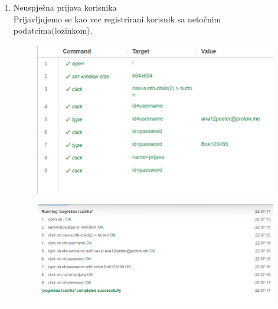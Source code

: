 \begin{enumerate}
    \item Neuspješna prijava korisnika\\
    Prijavljujemo se kao vec registrirani korisnik sa netočnim podatcima(lozinkom).
    \begin{figure}[H]
        \includegraphics[scale=0.30]{slike/deploy/fTest1a.png}
        \centering
        \label{fig:promjene2}
    \end{figure}
    \begin{figure}[H]
        \includegraphics[scale=0.30]{slike/deploy/fTest1b.png}
        \centering
        \label{fig:promjene1}
    \end{figure}


\end{enumerate}
